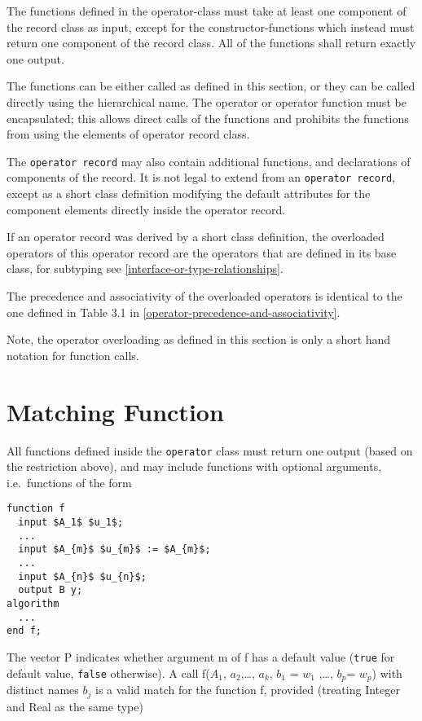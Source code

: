 The functions defined in the operator-class must take at least one
component of the record class as input, except for the
constructor-functions which instead must return one component of the
record class. All of the functions shall return exactly one output.

The functions can be either called as defined in this section, or they
can be called directly using the hierarchical name. The operator or
operator function must be encapsulated; this allows direct calls of the
functions and prohibits the functions from using the elements of
operator record class.

The \lstinline!operator record! may also contain additional functions, and
declarations of components of the record. It is not legal to extend from
an \lstinline!operator record!, except as a short class definition modifying the
default attributes for the component elements directly inside the
operator record.

If an operator record was derived by a short class definition, the
overloaded operators of this operator record are the operators that are
defined in its base class, for subtyping see \cref{interface-or-type-relationships}.

The precedence and associativity of the overloaded operators is
identical to the one defined in Table 3.1 in \cref{operator-precedence-and-associativity}.

\begin{nonnormative}
Note, the operator overloading as defined in this section is
only a short hand notation for function calls.
\end{nonnormative}

\section{Matching Function}\label{matching-function}

All functions defined inside the \lstinline!operator! class must return one
output (based on the restriction above), and may include functions with
optional arguments, i.e.\ functions of the form

\begin{lstlisting}[language=modelica]
function f
  input $A_1$ $u_1$;
  ...
  input $A_{m}$ $u_{m}$ := $A_{m}$;
  ...
  input $A_{n}$ $u_{n}$;
  output B y;
algorithm
  ...
end f;
\end{lstlisting}
The vector P indicates whether argument m of f has a default value
(\lstinline!true! for default value, \lstinline!false! otherwise). A call
f($A_1$, $a_{2}$,\ldots{}, $a_{k}$,
$b_{1}$ = $w_{1}$ ,\ldots{}, $b_{p}$=
$w_{p}$) with distinct names $b_{j}$ is a valid
match for the function f, provided (treating Integer and Real as the
same type)

